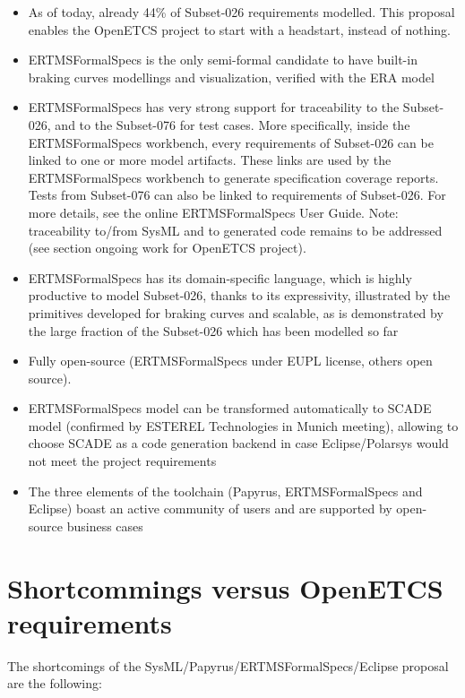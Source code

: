 \begin{itemize}
	\item As of today, already 44\% of Subset-026 requirements modelled. This proposal enables the OpenETCS project to start with a headstart, instead of nothing.
	\item ERTMSFormalSpecs is the only semi-formal candidate to have built-in braking curves modellings and visualization, verified with the ERA model
	\item ERTMSFormalSpecs has very strong support for traceability to the Subset-026, and to the Subset-076 for test cases. More specifically, inside the ERTMSFormalSpecs workbench, every requirements of Subset-026 can be linked to one or more model artifacts. These links are used by the ERTMSFormalSpecs workbench to generate specification coverage reports. Tests from Subset-076 can also be linked to requirements of Subset-026. For more details, see the online ERTMSFormalSpecs User Guide.  Note: traceability to/from SysML and to generated code remains to be addressed (see section ongoing work for OpenETCS project).
	\item ERTMSFormalSpecs has its domain-specific language, which is highly productive to model Subset-026, thanks to its expressivity, illustrated by the primitives
developed for braking curves and scalable, as is demonstrated by the large fraction of the Subset-026 which has been modelled so far
	\item Fully open-source (ERTMSFormalSpecs under EUPL license, others open source). 
	\item ERTMSFormalSpecs model can be transformed automatically to SCADE model (confirmed by ESTEREL Technologies in Munich meeting), allowing to choose SCADE as a code generation backend in case Eclipse/Polarsys would not meet the project requirements
	\item The three elements of the toolchain (Papyrus, ERTMSFormalSpecs and Eclipse) boast an active community of users and are supported by open-source business cases
\end{itemize}

\section{Shortcommings versus OpenETCS requirements}

The shortcomings of the SysML/Papyrus/ERTMSFormalSpecs/Eclipse proposal are the following:

